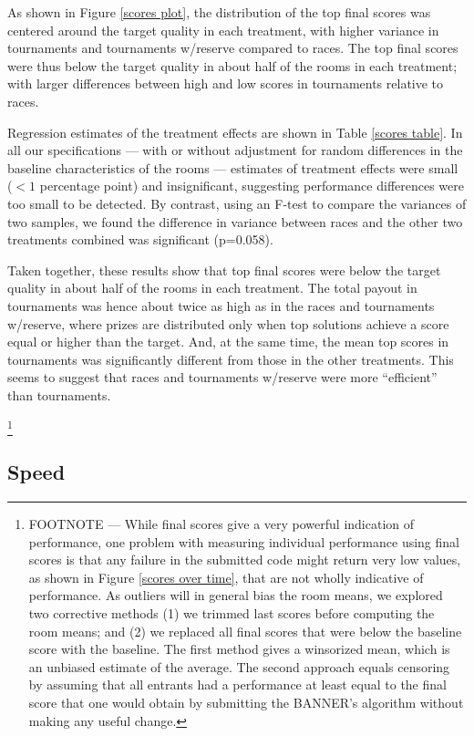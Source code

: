 \documentclass[10pt, titlepage]{article}
\begin{document}
As shown in Figure \ref{scores plot}, the distribution of the top final
scores was centered around the target quality in each treatment, with
higher variance in tournaments and tournaments w/reserve compared to
races. The top final scores were thus below the target quality in about
half of the rooms in each treatment; with larger differences between
high and low scores in tournaments relative to races.

Regression estimates of the treatment effects are shown in Table
\ref{scores table}. In all our specifications --- with or without
adjustment for random differences in the baseline characteristics of the
rooms --- estimates of treatment effects were small (\(<1\) percentage
point) and insignificant, suggesting performance differences were too
small to be detected. By contrast, using an F-test to compare the
variances of two samples, we found the difference in variance between
races and the other two treatments combined was significant (p=0.058).

Taken together, these results show that top final scores were below the
target quality in about half of the rooms in each treatment. The total
payout in tournaments was hence about twice as high as in the races and
tournaments w/reserve, where prizes are distributed only when top
solutions achieve a score equal or higher than the target. And, at the
same time, the mean top scores in tournaments was significantly
different from those in the other treatments. This seems to suggest that
races and tournaments w/reserve were more ``efficient'' than
tournaments.

\footnote{FOOTNOTE --- While final scores give a very powerful
  indication of performance, one problem with measuring individual
  performance using final scores is that any failure in the submitted
  code might return very low values, as shown in Figure
  \ref{scores over time}, that are not wholly indicative of performance.
  As outliers will in general bias the room means, we explored two
  corrective methods (1) we trimmed last scores before computing the
  room means; and (2) we replaced all final scores that were below the
  baseline score with the baseline. The first method gives a winsorized
  mean, which is an unbiased estimate of the average. The second
  approach equals censoring by assuming that all entrants had a
  performance at least equal to the final score that one would obtain by
  submitting the BANNER's algorithm without making any useful change.}

\subsection{Speed}\label{speed}
\end{document}
